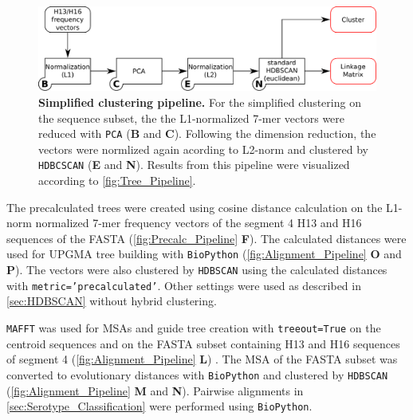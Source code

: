 \begin{figure}[!hbt]
    \centering
    \includegraphics[width=\textwidth]{Graphics/Simple.pdf}
    \caption[Simplified clustering pipeline]{\textbf{Simplified clustering pipeline.} For the simplified clustering on the sequence subset, the the L1-normalized 7-mer vectors were reduced with \texttt{PCA} (\textsf{\textbf{B}} and \textsf{\textbf{C}}). Following the dimension reduction, the vectors were normlized again acording to L2-norm and clustered by \texttt{HDBCSCAN} (\textsf{\textbf{E}} and \textsf{\textbf{N}}). Results from this pipeline were visualized according to \autoref{fig:Tree_Pipeline}.}
    \label{fig:Simple_Pipeline}
\end{figure}

The precalculated trees were created using cosine distance calculation on the L1-norm normalized 7-mer frequency vectors of the segment 4 H13 and H16 sequences of the FASTA (\autoref{fig:Precalc_Pipeline} \textsf{\textbf{F}}). The calculated distances were used for \gls{UPGMA} tree building with \texttt{BioPython} (\autoref{fig:Alignment_Pipeline} \textsf{\textbf{O}} and \textsf{\textbf{P}}). The vectors were also clustered by \texttt{HDBSCAN} using the calculated distances with \texttt{metric='precalculated'}. Other settings were used as described in \autoref{sec:HDBSCAN} without hybrid clustering.

\vspace{1em}

\texttt{MAFFT} was used for \glspl{MSA} and guide tree creation with \texttt{treeout=True} on the centroid sequences and on the FASTA subset containing H13 and H16 sequences of segment 4 (\autoref{fig:Alignment_Pipeline} \textsf{\textbf{L}}) \autocite{katoh_mafft_2013}. The \gls{MSA} of the FASTA subset was converted to evolutionary distances with \texttt{BioPython} and clustered by \texttt{HDBSCAN} (\autoref{fig:Alignment_Pipeline} \textsf{\textbf{M}} and \textsf{\textbf{N}}). Pairwise alignments in \autoref{sec:Serotype_Classification} were performed using \texttt{BioPython}.